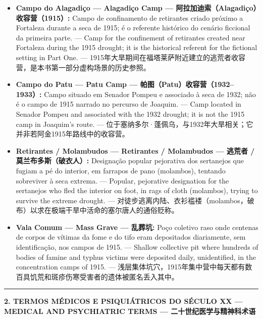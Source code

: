 \vspace{0.4em}
\begin{itemize}[itemsep=0.3em]
  \item \textbf{Campo do Alagadiço --- Alagadiço Camp --- 阿拉加迪索（Alagadiço）收容营（1915）:} Campo de confinamento de retirantes criado próximo a Fortaleza durante a seca de 1915; é o referente histórico do cenário ficcional da primeira parte. --- Camp for the confinement of retirantes created near Fortaleza during the 1915 drought; it is the historical referent for the fictional setting in Part One. --- 1915年大旱期间在福塔莱萨附近建立的逃荒者收容营，是本书第一部分虚构场景的历史参照。
  \item \textbf{Campo do Patu --- Patu Camp --- 帕图（Patu）收容营（1932--1933）:} Campo situado em Senador Pompeu e associado à seca de 1932; não é o campo de 1915 narrado no percurso de Joaquim. --- Camp located in Senador Pompeu and associated with the 1932 drought; it is not the 1915 camp in Joaquim's route. --- 位于塞纳多尔·蓬佩乌，与1932年大旱相关；它并非若阿金1915年路线中的收容营。
  \item \textbf{Retirantes / Molambudos --- Retirantes / Molambudos --- 逃荒者 / 莫兰布多斯（破衣人）:} Designação popular pejorativa dos sertanejos que fugiam a pé do interior, em farrapos de pano (molambos), tentando sobreviver à seca extrema. --- Popular, pejorative designation for the sertanejos who fled the interior on foot, in rags of cloth (molambos), trying to survive the extreme drought. --- 对徒步逃离内陆、衣衫褴褛（molambos，破布）以求在极端干旱中活命的塞尔唐人的通俗贬称。
  \item \textbf{Vala Comum --- Mass Grave --- 乱葬坑:} Poço coletivo raso onde centenas de corpos de vítimas da fome e do tifo eram depositados diariamente, sem identificação, nos campos de 1915. --- Shallow collective pit where hundreds of bodies of famine and typhus victims were deposited daily, unidentified, in the concentration camps of 1915. --- 浅层集体坑穴，1915年集中营中每天都有数百具饥荒和斑疹伤寒受害者的遗体被匿名丢入其中。
\end{itemize}

\vspace{0.8em}
\noindent\rule{\textwidth}{0.5pt}
\vspace{0.6em}

\noindent\textbf{2. TERMOS MÉDICOS E PSIQUIÁTRICOS DO SÉCULO XX --- MEDICAL AND PSYCHIATRIC TERMS --- 二十世纪医学与精神科术语}

